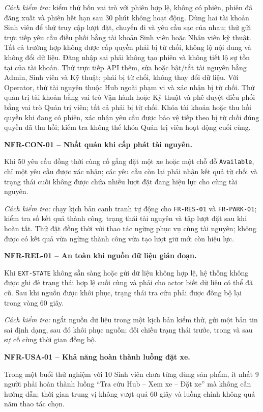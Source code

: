 \textit{Cách kiểm tra:} kiểm thử bốn vai trò với phiên hợp lệ, không có phiên, phiên đã đăng xuất và phiên hết hạn sau 30 phút không hoạt động. Dùng hai tài khoản Sinh viên để thử truy cập lượt đặt, chuyến đi và yêu cầu sạc của nhau; thử gửi trực tiếp yêu cầu điều phối bằng tài khoản Sinh viên hoặc Nhân viên kỹ thuật. Tất cả trường hợp không được cấp quyền phải bị từ chối, không lộ nội dung và không đổi dữ liệu. Đăng nhập sai phải không tạo phiên và không tiết lộ sự tồn tại của tài khoản. Thử trực tiếp API thêm, sửa hoặc bật/tắt tài nguyên bằng Admin, Sinh viên và Kỹ thuật; phải bị từ chối, không thay đổi dữ liệu. Với Operator, thử tài nguyên thuộc Hub ngoài phạm vi và xác nhận bị từ chối. Thử quản trị tài khoản bằng vai trò Vận hành hoặc Kỹ thuật và phê duyệt điều phối bằng vai trò Quản trị viên; tất cả phải bị từ chối. Khóa tài khoản hoặc thu hồi quyền khi đang có phiên, xác nhận yêu cầu được bảo vệ tiếp theo bị từ chối đúng quyền đã thu hồi; kiểm tra không thể khóa Quản trị viên hoạt động cuối cùng.

\medskip
\noindent\textbf{NFR-CON-01 -- Nhất quán khi cấp phát tài nguyên.}\par
\nopagebreak[4]
Khi 50 yêu cầu đồng thời cùng cố gắng đặt một xe hoặc một chỗ đỗ \texttt{Available}, chỉ một yêu cầu được xác nhận; các yêu cầu còn lại phải nhận kết quả từ chối và trạng thái cuối không được chứa nhiều lượt đặt đang hiệu lực cho cùng tài nguyên.

\textit{Cách kiểm tra:} chạy kịch bản cạnh tranh tự động cho \texttt{FR-RES-01} và \texttt{FR-PARK-01}; kiểm tra số kết quả thành công, trạng thái tài nguyên và tập lượt đặt sau khi hoàn tất. Thử đặt đồng thời với thao tác ngừng phục vụ cùng tài nguyên; không được có kết quả vừa ngừng thành công vừa tạo lượt giữ mới còn hiệu lực.

\medskip
\noindent\textbf{NFR-REL-01 -- An toàn khi nguồn dữ liệu gián đoạn.}\par
\nopagebreak[4]
Khi \texttt{EXT-STATE} không sẵn sàng hoặc gửi dữ liệu không hợp lệ, hệ thống không được ghi đè trạng thái hợp lệ cuối cùng và phải cho actor biết dữ liệu có thể đã cũ. Sau khi nguồn được khôi phục, trạng thái tra cứu phải được đồng bộ lại trong vòng 60 giây.

\textit{Cách kiểm tra:} ngắt nguồn dữ liệu trong một kịch bản kiểm thử, gửi một bản tin sai định dạng, sau đó khôi phục nguồn; đối chiếu trạng thái trước, trong và sau sự cố cùng thời gian đồng bộ.

\medskip
\noindent\textbf{NFR-USA-01 -- Khả năng hoàn thành luồng đặt xe.}\par
\nopagebreak[4]
Trong một buổi thử nghiệm với 10 Sinh viên chưa từng dùng sản phẩm, ít nhất 9 người phải hoàn thành luồng ``Tra cứu Hub -- Xem xe -- Đặt xe'' mà không cần hướng dẫn; thời gian trung vị không vượt quá 60 giây và luồng chính không quá năm thao tác chọn.

